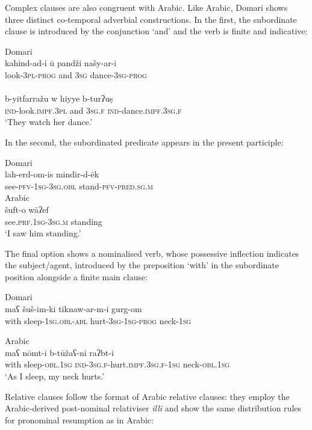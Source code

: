 \documentclass[output=paper]{langsci/langscibook}
\begin{document}
Complex clauses are also congruent with Arabic. Like Arabic, Domari shows three distinct co-temporal adverbial constructions. In the first, the subordinate clause is introduced by the conjunction ‘and’ and the verb is finite and indicative:

\ea
\ea
{Domari}\\
\gll kahind-ad-i ū pandži našy-ar-i  \\
     look-\textsc{3pl-prog} and \textsc{3sg} dance-\textsc{3sg-prog}\\
     
\\
\gll b-yitfarražu w hiyye b-turʔuṣ  \\
     \textsc{ind}-look.\textsc{impf.3pl} and \textsc{3sg.f} \textsc{ind}-dance.\textsc{impf.3sg.f}\\
\glt ‘They watch her dance.’
\z
\z

In the second, the subordinated predicate appears in the present participle:

\ea
\ea
{Domari}\\
\gll lah-erd-om-is mindir-d-ēk    \\
       see-\textsc{pfv-1sg-3sg.obl} stand-\textsc{pfv-pred.sg.m}\\
 
\ex
{Arabic}\\
\gll šuft-o   wāʔef    \\
     see.\textsc{prf.1sg-3sg.m} standing\\
\glt ‘I saw him standing.’
\z
\z

The final option shows a nominalised verb, whose possessive inflection indicates the subject/agent, introduced by the preposition ‘with’ in the subordinate position alongside a finite main clause:

\ea
\ea
{Domari}\\
\gll maʕ šuš-im-ki tiknaw-ar-m-i gurg-om  \\
       with sleep-\textsc{1sg.obl-abl} hurt-\textsc{3sg-1sg-prog} neck-1\textsc{sg}\\

\newpage

\ex
{Arabic}\\
\gll maʕ nōmt-i b-tūžaʕ-ni raʔbt-i  \\
       with sleep-\textsc{obl.1sg} \textsc{ind-3sg.f}-hurt.\textsc{impf.3sg.f-1sg} neck-\textsc{obl.1sg}\\
\glt       ‘As I sleep, my neck hurts.’
\z
\z

Relative clauses follow the format of Arabic relative clauses: they employ the Arabic-derived post-nominal relativiser \textit{illi} and show the same distribution rules for pronominal resumption as in Arabic:
\end{document}
